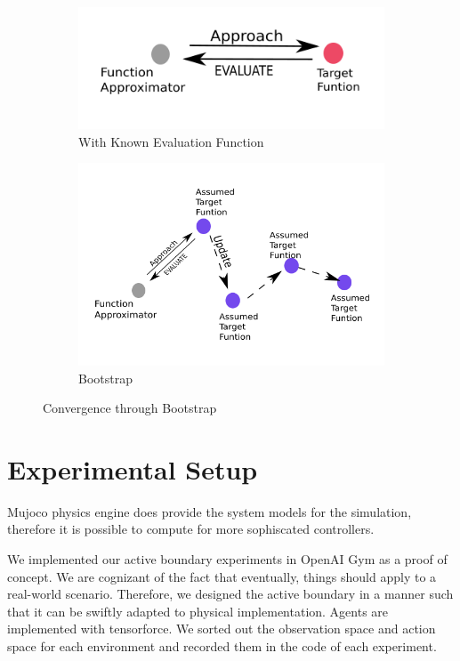 \documentclass[journal]{IEEEtran}
\begin{document}
\begin{figure}
\centering
\begin{subfigure}{0.25\textwidth}
  \centering
  \includegraphics[width=\linewidth]{onego.png}
  \caption{With Known Evaluation Function}
\end{subfigure}%
\begin{subfigure}{.25\textwidth}
  \centering
  \includegraphics[width=\linewidth]{bootstrap.png}
  \caption{Bootstrap}
\end{subfigure}
\caption{Convergence through Bootstrap}
\label{fig:bootstrap}
\end{figure}



\section{Experimental Setup}

Mujoco physics engine does provide the system models for the simulation, therefore it is possible to compute for more sophiscated controllers.


We implemented our active boundary experiments in OpenAI Gym\cite{Brockman2016OpenAIG} as a proof of concept. We are cognizant of the fact that eventually, things should apply to a real-world scenario. Therefore, we designed the active boundary in a manner such that it can be swiftly adapted to physical implementation. Agents are implemented with tensorforce\cite{tensorforce}. We sorted out the observation space and action space for each environment and recorded them in the code of each experiment.
\end{document}
